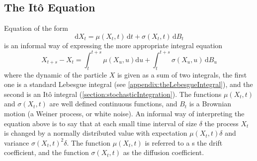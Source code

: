 \documentclass[12pt]{book}
\begin{document}
\subsection{The It\^{o} Equation}\label{subsection:theItoEquation}
Equation of the form 
\begin{equation*}
 \mathrm{d} X_t = \mu(X_t,t)\, \mathrm{d} t +  \sigma(X_t,t)\, \mathrm{d} B_t
\end{equation*}
is an informal way of expressing the more appropriate integral equation 
\begin{equation*}
X_{t+s} - X_{t} = \int_t^{t+s} \mu(X_u,u) \mathrm{d} u + \int_t^{t+s} \sigma(X_u,u)\, \mathrm{d} B_u
\end{equation*}
where the dynamic of the particle $X$ is given as a sum of two integrals, the first one is a standard Lebesgue integral (see \ref{appendix:theLebesgueIntegral}), and the second is an It\^{o} integral (\ref{section:stochasticIntegration}).  
The functions $\mu(X_t,t)$ and $\sigma(X_t,t)$ are well defined continuous functions, and $B_t$ is a Brownian motion (a Weiner process, or white noise). An informal way of interpreting the equation above is to say that at each small time interval of size $\delta$ the process $X_t$ is changed by a normally distributed value with expectation $\mu(X_t,t)\delta$ and variance $\sigma(X_t,t)^2\delta$. 
The function $\mu(X_t,t)$ is referred to a s the drift coefficient, and the function $\sigma(X_t,t)$ as the diffusion coefficient. 
\end{document}
